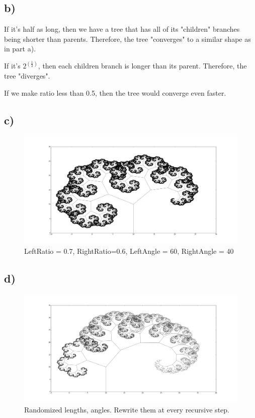 \documentclass[12pt]{article}\pagestyle{myheadings}
\theoremstyle{plain}
\begin{document}
\subsection{b)}

If it's half as long, then we have a tree that has all of its "children" branches being shorter than parents. Therefore, the tree "converges" to a similar shape as in part a). 

If it's $2^(\frac{1}{2})$, then each children branch is longer than its parent. Therefore, the tree "diverges". 

If we make ratio less than 0.5, then the tree would converge even faster. 

\subsection{c)}

\begin{figure}[H]
\centering
\includegraphics[scale=.2]{7_6_60_40}
\caption{LeftRatio = 0.7, RightRatio=0.6, LeftAngle = 60, RightAngle = 40}
\label{fig:my_label}
\end{figure}


\subsection{d)}

\begin{figure}[H]
\centering
\includegraphics[scale=.2]{random_angle_length_rewriting}
\caption{Randomized lengths, angles. Rewrite them at every recursive step.}
\label{fig:my_label}
\end{figure}
\end{document}
